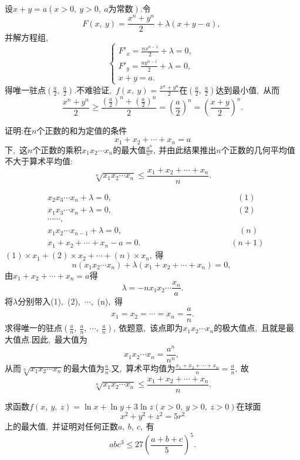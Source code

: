 	\begin{solution}
		设$x+y=a(x>0,\ y>0,\ a\text{为常数}).$令
		$$F(x,\ y)=\frac{x^n+y^n}{2}+\lambda(x+y-a),\ $$
		并解方程组,\ 
		$$
		\left\{\begin{matrix} 
			F'_x=\frac{nx^{n-1}}{2}+\lambda=0,\ \\
			F'_y=\frac{ny^{n-1}}{2}+\lambda=0,\ \\
			x+y=a.
		\end{matrix}\right.    
		$$
		得唯一驻点$\left(\frac{a}{2},\ \frac{a}{2}\right).$不难验证,\ $f(x,\ y)=\frac{x^n+y^n}{2}$在$\left(\frac{a}{2},\ \frac{a}{2}\right)$达到最小值,\ 从而
		$$\frac{x^n+y^n}{2}\ge\frac{\left(\frac{a}{2}\right)^n+\left(\frac{a}{2}\right)^n}{2}=\left(\frac{a}{2}\right)^n=\left(\frac{x+y}{2}\right)^n.$$
	\end{solution}
	\newpage
	\begin{problem}
		证明:在$n$个正数的和为定值的条件
		$$x_1+x_2+\cdots+x_n=a$$
		下,\ 这$n$个正数的乘积$x_1x_2\cdots x_n$的最大值$\frac{a^n}{n^n},\ $并由此结果推出$n$个正数的几何平均值不大于算术平均值:
		$$\sqrt[n]{x_1x_2\cdots x_n}\le\frac{x_1+x_2+\cdots+x_n}{n}.$$
	\end{problem}
	
	\begin{solution}
		\begin{align*}
			&x_2x_3\cdots x_n+\lambda=0,\ \qquad\qquad\qquad\qquad\qquad\qquad\quad\qquad(1)\\
			&x_1x_3\cdots x_n+\lambda=0,\ \qquad\qquad\qquad\qquad\qquad\qquad\quad\qquad(2)\\
			&\cdots\cdots,\ \\
			&x_1x_2\cdots x_{n-1}+\lambda=0,\ \qquad\qquad\qquad\qquad\qquad\qquad\qquad(n)\\
			&x_1+x_2+\cdots+x_n-a=0.\qquad\qquad\qquad\qquad\quad\qquad(n+1)
		\end{align*}
		$(1)\times x_1+(2)\times x_2+\cdots+(n)\times x_n,\ $得\\
		$$n(x_1x_2\cdots x_n)+\lambda(x_1+x_2+\cdots+x_n)=0,\ $$
		由$x_1+x_2+\cdots+x_n=a$得
		$$\lambda=-nx_1x_2\cdots\frac{x_n}{a}.$$
		将$\lambda$分别带入(1),\ (2),\ $\cdots$,\ (n),\ 得
		$$x_1=x_2=\cdots=x_n=\frac{a}{n}.$$
		求得唯一的驻点$\left(\frac{a}{n},\ \frac{a}{n},\ \cdots,\ \frac{a}{n}\right),\ $依题意,\ 该点即为$x_1x_2\cdots x_n$的极大值点,\ 且就是最大值点.因此,\ 最大值为
		$$x_1x_2\cdots x_n=\frac{a^n}{n^n},\ $$
		从而$\sqrt[n]{x_1x_2\cdots x_n}$的最大值为$\frac{a}{n}.$又,\ 算术平均值为$\frac{x_1+x_2+\cdots+x_n}{n}=\frac{a}{n},\ $故
		$$\sqrt[n]{x_1x_2\cdots x_n}\le\frac{x_1+x_2+\cdots+x_n}{n}.$$ 
	\end{solution}
	\newpage
	\begin{problem}
		求函数$f(x,\ y,\ z)=\ln x+\ln y+3\ln z(x>0,\ y>0,\ z>0)$在球面
		$$x^2+y^2+z^2=5r^2$$
		上的最大值,\ 并证明对任何正数$a,\ b,\ c,\ $有
		$$abc^3\le 27\left(\frac{a+b+c}{5}\right)^5.$$
	\end{problem}
	
